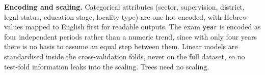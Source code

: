 \textbf{Encoding and scaling.} Categorical attributes (sector, supervision,
district, legal status, education stage, locality type) are one-hot encoded, with
Hebrew values mapped to English first for readable outputs. The exam
\texttt{year} is encoded as four independent periods rather than a numeric trend,
since with only four years there is no basis to assume an equal step between
them. Linear models are standardised inside the cross-validation folds, never on
the full dataset, so no test-fold information leaks into the scaling. Trees need
no scaling.

